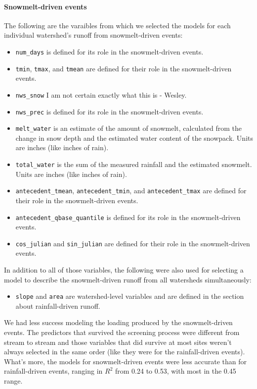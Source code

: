 \documentclass[10pt]{article}
\begin{document}
\paragraph{Snowmelt-driven events} 

The following are the varaibles from which we selected the models for each individual watershed's runoff from snowmelt-driven events:\\

\begin{itemize}
    \item \verb!num_days! is defined for its role in the snowmelt-driven events.
    \item \verb!tmin!, \verb!tmax!, and \verb!tmean! are defined for their role in the snowmelt-driven events.
    \item \verb!nws_snow! I am not certain exactly what this is - Wesley.
    \item \verb!nws_prec! is defined for its role in the snowmelt-driven events.
    \item \verb!melt_water! is an estimate of the amount of snowmelt, calculated from the change in snow depth and the estimated water content of the snowpack. Units are inches (like inches of rain).
    \item \verb!total_water! is the sum of the measured rainfall and the estimated snowmelt. Units are inches (like inches of rain).
    \item \verb!antecedent_tmean!, \verb!antecedent_tmin!, and \verb!antecedent_tmax! are defined for their role in the snowmelt-driven events.
    \item \verb!antecedent_qbase_quantile! is defined for its role in the snowmelt-driven events.
    \item \verb!cos_julian! and \verb!sin_julian! are defined for their role in the snowmelt-driven events.
\end{itemize}

In addition to all of those variables, the following were also used for selecting a model to describe the snowmelt-driven runoff from all watersheds simultaneously:

\begin{itemize}
    \item \verb!slope! and \verb!area! are watershed-level variables and are defined in the section about rainfall-driven runoff.
\end{itemize}
 
 We had less success modeling the loading produced by the snowmelt-driven events. The predictors that survived the screening process were different from stream to stream and those variables that did survive at most sites weren't always selected in the same order (like they were for the rainfall-driven events). What's more, the models for snowmelt-driven events were less accurate than for rainfall-driven events, ranging in $R^2$ from 0.24 to 0.53, with most in the 0.45 range.\\
\end{document}
